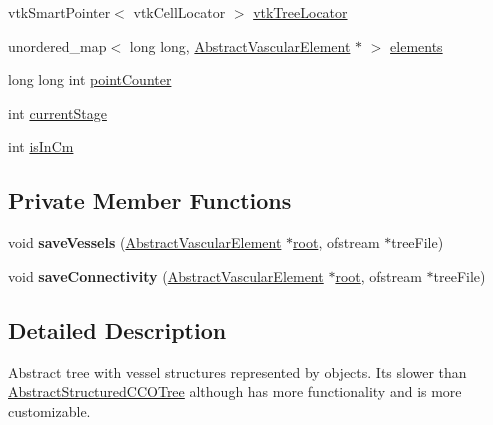 \begin{DoxyCompactItemize}
\item 
vtk\+Smart\+Pointer$<$ vtk\+Cell\+Locator $>$ \hyperlink{class_abstract_object_c_c_o_tree_ad46c9e54e0a3093cbd5968ee7f2fa71a}{vtk\+Tree\+Locator}
\item 
unordered\+\_\+map$<$ long long, \hyperlink{class_abstract_vascular_element}{Abstract\+Vascular\+Element} $\ast$ $>$ \hyperlink{class_abstract_object_c_c_o_tree_a4635f6215b084867ee70135812c6971e}{elements}
\item 
long long int \hyperlink{class_abstract_object_c_c_o_tree_a8d8512b976d31017c242e229dafebd0a}{point\+Counter}
\item 
int \hyperlink{class_abstract_object_c_c_o_tree_a3597fe2e3dd70d3da743674eb91c2831}{current\+Stage}
\item 
int \hyperlink{class_abstract_object_c_c_o_tree_a11ab0fe8d03165bcbf23bc3cca75cafc}{is\+In\+Cm}
\end{DoxyCompactItemize}
\subsection*{Private Member Functions}
\begin{DoxyCompactItemize}
\item 
void {\bfseries save\+Vessels} (\hyperlink{class_abstract_vascular_element}{Abstract\+Vascular\+Element} $\ast$\hyperlink{class_abstract_object_c_c_o_tree_ae1b17938ad34d92629915159c49bb89a}{root}, ofstream $\ast$tree\+File)\hypertarget{class_abstract_object_c_c_o_tree_a310f2cfa7e9c83f68070452e48d31917}{}\label{class_abstract_object_c_c_o_tree_a310f2cfa7e9c83f68070452e48d31917}

\item 
void {\bfseries save\+Connectivity} (\hyperlink{class_abstract_vascular_element}{Abstract\+Vascular\+Element} $\ast$\hyperlink{class_abstract_object_c_c_o_tree_ae1b17938ad34d92629915159c49bb89a}{root}, ofstream $\ast$tree\+File)\hypertarget{class_abstract_object_c_c_o_tree_a3240756f82d0b566509ddf1d9b6aa18e}{}\label{class_abstract_object_c_c_o_tree_a3240756f82d0b566509ddf1d9b6aa18e}

\end{DoxyCompactItemize}


\subsection{Detailed Description}
Abstract tree with vessel structures represented by objects. Its slower than \hyperlink{class_abstract_structured_c_c_o_tree}{Abstract\+Structured\+C\+C\+O\+Tree} although has more functionality and is more customizable. 

